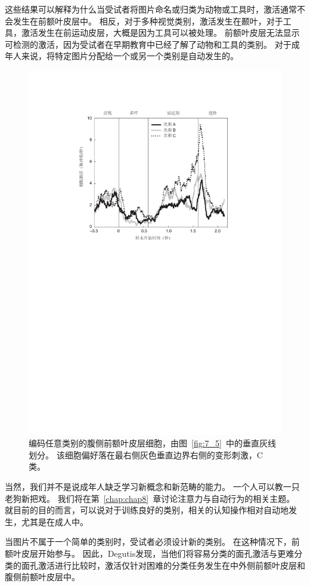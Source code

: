 这些结果可以解释为什么当受试者将图片命名或归类为动物或工具时，激活通常不会发生在前额叶皮层中\cite{martin2007representation}。
相反，对于多种视觉类别，激活发生在颞叶，对于工具，激活发生在前运动皮层，大概是因为工具可以被处理。
前额叶皮层无法显示可检测的激活，因为受试者在早期教育中已经了解了动物和工具的类别。
对于成年人来说，将特定图片分配给一个或另一个类别是自动发生的。


\begin{figure}
	\centering
	\includegraphics[width=0.62\linewidth]{chap7/7_7}
	\caption{编码任意类别的腹侧前额叶皮层细胞，由图~\ref{fig:7_5}~中的垂直灰线划分。
		该细胞偏好落在最右侧灰色垂直边界右侧的变形刺激，C 类\cite{freedman2002visual}。\label{fig:7_7}}
\end{figure}
\par


当然，我们并不是说成年人缺乏学习新概念和新范畴的能力。 
一个人可以教一只老狗新把戏。 
我们将在第~\ref{chap:chap8}~章讨论注意力与自动行为的相关主题。
就目前的目的而言，可以说对于训练良好的类别，相关的认知操作相对自动地发生，尤其是在成人中。
\par


当图片不属于一个简单的类别时，受试者必须设计新的类别。 
在这种情况下，前额叶皮层开始参与。 
因此，Degutis\cite{degutis2007distinct}发现，当他们将容易分类的面孔激活与更难分类的面孔激活进行比较时，激活仅针对困难的分类任务发生在中外侧前额叶皮层和腹侧前额叶皮层中。


